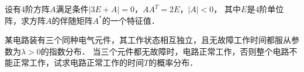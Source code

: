 \documentclass[plain,noanswer,medmath]{../../template/jnuexam}
\begin{document}

\begin{problem}
设有$4$阶方阵$A$满足条件$|3E + A| = 0$，$AA^T = 2E$，$|A| < 0$，
其中$E$是$4$阶单位阵，求方阵$A$的伴随矩阵$A^*$的一个特征值．
\end{problem}






\begin{problem}
某电路装有三个同种电气元件，其工作状态相互独立，且无故障工作时间都服从参数为$\lambda > 0$的指数分布．
当三个元件都无故障时，电路正常工作，否则整个电路不能正常工作，试求电路正常工作的时间$T$的概率分布．
\end{problem}
\end{document}

